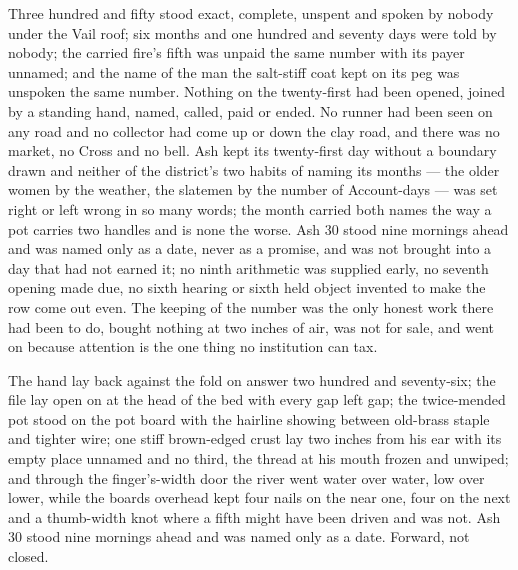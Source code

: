 Three hundred and fifty stood exact, complete, unspent and spoken by nobody under the Vail roof; six months and one hundred and seventy days were told by nobody; the carried fire’s fifth was unpaid the same number with its payer unnamed; and the name of the man the salt-stiff coat kept on its peg was unspoken the same number. Nothing on the twenty-first had been opened, joined by a standing hand, named, called, paid or ended. No runner had been seen on any road and no collector had come up or down the clay road, and there was no market, no Cross and no bell. Ash kept its twenty-first day without a boundary drawn and neither of the district’s two habits of naming its months --- the older women by the weather, the slatemen by the number of Account-days --- was set right or left wrong in so many words; the month carried both names the way a pot carries two handles and is none the worse. Ash 30 stood nine mornings ahead and was named only as a date, never as a promise, and was not brought into a day that had not earned it; no ninth arithmetic was supplied early, no seventh opening made due, no sixth hearing or sixth held object invented to make the row come out even. The keeping of the number was the only honest work there had been to do, bought nothing at two inches of air, was not for sale, and went on because attention is the one thing no institution can tax.

The hand lay back against the fold on answer two hundred and seventy-six; the file lay open on  at the head of the bed with every gap left gap; the twice-mended pot stood on the pot board with the hairline showing between old-brass staple and tighter wire; one stiff brown-edged crust lay two inches from his ear with its empty place unnamed and no third, the thread at his mouth frozen and unwiped; and through the finger’s-width door the river went water over water, low over lower, while the boards overhead kept four nails on the near one, four on the next and a thumb-width knot where a fifth might have been driven and was not. Ash 30 stood nine mornings ahead and was named only as a date. Forward, not closed.
